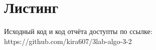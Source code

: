 \section{Листинг}

Исходный код и код отчёта доступты по ссылке: 
https://github.com/kira607/3lab-algo-3-2